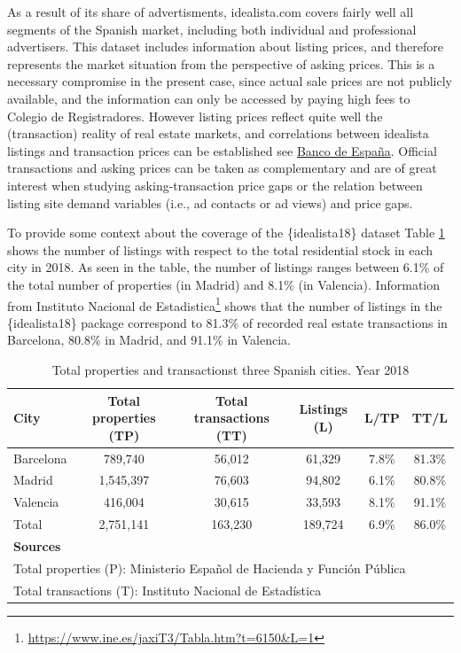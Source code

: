 \documentclass[Royal,times,sageh]{sagej}
\begin{document}
As a result of its share of advertisments, idealista.com covers fairly
well all segments of the Spanish market, including both individual and
professional advertisers. This dataset includes information about
listing prices, and therefore represents the market situation from the
perspective of asking prices. This is a necessary compromise in the
present case, since actual sale prices are not publicly available, and
the information can only be accessed by paying high fees to Colegio de
Registradores. However listing prices reflect quite well the
(transaction) reality of real estate markets, and correlations between
idealista listings and transaction prices can be established see
\href{https://papers.ssrn.com/sol3/papers.cfm?abstract_id=3400031}{Banco
de España}. Official transactions and asking prices can be taken as
complementary and are of great interest when studying asking-transaction
price gaps or the relation between listing site demand variables (i.e.,
ad contacts or ad views) and price gaps.

To provide some context about the coverage of the \{idealista18\}
dataset Table \ref{tab:transactions} shows the number of listings with
respect to the total residential stock in each city in 2018. As seen in
the table, the number of listings ranges between 6.1\% of the total
number of properties (in Madrid) and 8.1\% (in Valencia). Information
from Instituto Nacional de Estadistica\footnote{\url{https://www.ine.es/jaxiT3/Tabla.htm?t=6150&L=1}}
shows that the number of listings in the \{idealista18\} package
correspond to 81.3\% of recorded real estate transactions in Barcelona,
80.8\% in Madrid, and 91.1\% in Valencia.

\begin{table}[!ht]
\centering
\caption{Total properties and transactionst three Spanish cities. Year 2018} 
\label{tab:transactions} 
\begin{tabular}{lccccc}
City & Total properties (TP) & Total transactions (TT) & Listings (L) & L/TP & TT/L \\
\hline
Barcelona &  789,740  &  56,012  &  61,329  & 7.8\% & 81.3\%  \\ 
Madrid &  1,545,397  &  76,603  &  94,802  & 6.1\%  & 80.8\% \\ 
Valencia &  416,004  &  30,615  &  33,593  & 8.1\% & 91.1\% \\ 
\hline
Total &  2,751,141  &  163,230  &  189,724  & 6.9\% & 86.0\% \\ 
\hline
\multicolumn{6}{l}{{\footnotesize \textbf{Sources}}}\\
\multicolumn{6}{l}{{\footnotesize Total properties (P): Ministerio Español de Hacienda y Función Pública}}\\
\multicolumn{6}{l}{{\footnotesize Total transactions (T): Instituto Nacional de Estadística}}\\
\end{tabular}
\end{table}
\end{document}
